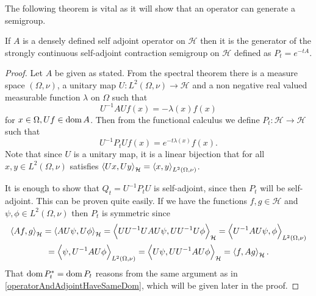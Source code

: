 \medskip
\noi The following theorem is vital as it will show that an operator can generate a semigroup. 

\medskip
\begin{theorem}\label{genSemigroup}
	If $A$ is a densely defined self adjoint operator on $\mathcal{H}$ then it is the generator of the strongly continuous self-adjoint contraction semigroup on $\mathcal{H}$ defined as $P_t = e^{-tA}$.
\end{theorem}

\clearpage
\begin{proof}
	
	Let $A$ be given as stated. From the spectral theorem \cite[Theorem 1.1.2]{fabriceDirichelt} there is a measure space $(\Omega, \nu)$, a unitary map $U\colon L^2(\Omega, \nu) \to \mathcal{H}$ and a non negative real valued measurable function $\lambda$ on $\Omega$ such that
	\begin{equation}
		U^{-1}AUf(x) = -\lambda(x)f(x)
	\end{equation}
	for $x \in \Omega, U f \in \operatorname{dom} A$. Then from the functional calculus \cite[Theorem 1.1.3]{fabriceDirichelt} we define \nl $P_t\colon \mathcal{H} \to \mathcal{H}$ such that
	\begin{equation}
				U^{-1}P_tUf(x) = e^{-t \lambda(x)}f(x).
	\end{equation}
	Note that since $U$ is a unitary map, it is a linear bijection that for all $x,y \in L^2(\Omega, \nu)$ satisfies $\left\langle Ux, Uy \right\rangle_{\mathcal{H}} = \left\langle x, y \right\rangle_{L^2(\Omega, \nu)}$.
	
	It is enough to show that $Q_t = U^{-1}P_t U$ is self-adjoint, since then $P_t$ will be self-adjoint. This can be proven quite easily. If we have the functions $f, g \in \mathcal{H}$ and $\psi, \phi \in L^{2}(\Omega, \nu)$ then $P_t$ is symmetric since
	\begin{multline}
	\left\langle Af, g \right\rangle_{\mathcal{H}} = \left\langle AU\psi, U\phi \right\rangle_{\mathcal{H}} = \left\langle UU^{-1}UAU\psi, UU^{-1}U\phi \right\rangle_{\mathcal{H}} = \left\langle U^{-1}AU \psi, \phi \right\rangle_{L^2(\Omega, \nu)} \\
	=  \left\langle \psi, U^{-1}AU \phi \right\rangle_{L^2(\Omega, \nu)} = \left\langle U\psi, UU^{-1}AU\phi \right\rangle_{\mathcal{H}} = \left\langle f, Ag \right\rangle_{\mathcal{H}}.
	\end{multline}
	That $\operatorname{dom} P_t^{*} = \operatorname{dom} P_t$ reasons from the same argument as in \eqref{operatorAndAdjointHaveSameDom}, which will be given later in the proof.
	

\end{proof}
